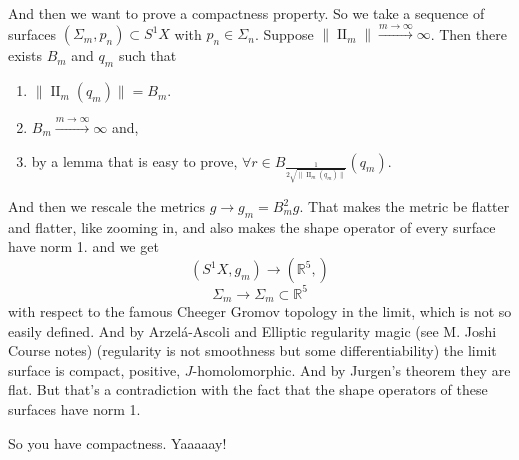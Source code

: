 And then we want to prove a compactness property. So we take a sequence of surfaces $(\Sigma_m,p_n)\subset S^1X$ with $p_n \in \Sigma_n$. Suppose $\|\operatorname{I I}_m\|\xrightarrow{m \to \infty}\infty$. Then there exists $B_m$ and  $q_m$ such that
 \begin{enumerate}[label=(\roman*)]
\item $\| \operatorname{ I I}_m(q_m)\|=B_m$.
\item $B_m\xrightarrow{m \to \infty}\infty$ and,
\item by a lemma that is easy to prove, $\forall  r\in B_{\frac{1}{2\sqrt{\|\operatorname{I I}_m(q_m)\|} }}(q_m)$.
\end{enumerate}
And then we rescale the metrics $g \to g_m=B^2_mg$. That makes the metric be flatter and flatter, like zooming in, and also makes the shape operator of every surface have norm 1. and we get
\[(S^1X,g_m)\longrightarrow(\mathbb{R}^5,)\]
\[\Sigma_m\longrightarrow \Sigma_m \subset\mathbb{R}^5\]
with respect to the famous Cheeger Gromov topology in the limit, which is not so easily defined. And by Arzelá-Ascoli and Elliptic regularity magic (see M. Joshi Course notes) (regularity is not smoothness but some differentiability) the limit surface is compact, positive, $J$-homolomorphic. And by Jurgen's theorem they are flat. But that's a contradiction with the fact that the shape operators of these surfaces have norm 1.

So you have compactness. Yaaaaay!


